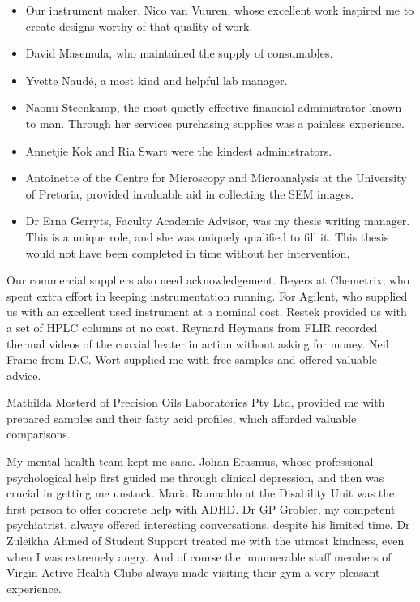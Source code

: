 \documentclass[
11pt, %
english, %
singlespacing, %
headsepline, %
]{MastersDoctoralThesis} %
\begin{document}
\begin{acknowledgements}
\begin{itemize}
\item Our instrument maker, Nico van Vuuren, whose excellent work inspired me to
create designs worthy of that quality of work.

\item David Masemula, who maintained the supply of consumables.

\item Yvette Naudé, a most kind and helpful lab manager.

\item Naomi Steenkamp, the most quietly effective financial administrator known to
man. Through her services purchasing supplies was a painless experience.

\item Annetjie Kok and Ria Swart were the kindest administrators.

\item Antoinette of the Centre for Microscopy and Microanalysis at the
University of Pretoria, provided invaluable aid in collecting the SEM images.

\item Dr Erna Gerryts, Faculty Academic Advisor, was my thesis writing manager.
This is a unique role, and she was uniquely qualified to fill it. This thesis
would not have been completed in time without her intervention.

\end{itemize}

Our commercial suppliers also need acknowledgement. Beyers at Chemetrix, who
spent extra effort in keeping instrumentation running. For Agilent, who supplied
us with an excellent used instrument at a nominal cost. Restek provided us with a
set of HPLC columns at no cost. Reynard Heymans from FLIR recorded thermal
videos of the coaxial heater in action without asking for money. Neil Frame from
D.C. Wort supplied me with free samples and offered valuable advice.

Mathilda Mosterd of Precision Oils Laboratories Pty Ltd, provided me with
prepared samples and their fatty acid profiles, which afforded valuable
comparisons.

My mental health team kept me sane. Johan Erasmus, whose professional
psychological help first guided me through clinical depression, and then was
crucial in getting me unstuck. Maria Ramaahlo at the Disability Unit was the
first person to offer concrete help with ADHD. Dr GP Grobler, my competent
psychiatrist, always offered interesting conversations, despite his limited
time. Dr Zuleikha Ahmed of Student Support treated me with the utmost kindness,
even when I was extremely angry. And of course the innumerable staff members of
Virgin Active Health Clubs always made visiting their gym a very pleasant
experience.


\end{acknowledgements}
\end{document}
